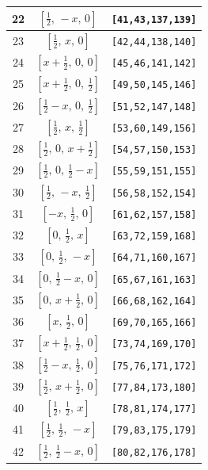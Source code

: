 \documentclass[fleqn,8pt]{jsarticle}
\begin{document}
\begin{longtable}{ccc}
22 & $\left[ \frac{1}{2},\, - x,\, 0 \right]$ & {\tt [41,43,137,139]} \\ \hline
23 & $\left[ \frac{1}{2},\, x,\, 0 \right]$ & {\tt [42,44,138,140]} \\ \hline
24 & $\left[ x + \frac{1}{2},\, 0,\, 0 \right]$ & {\tt [45,46,141,142]} \\ \hline
25 & $\left[ x + \frac{1}{2},\, 0,\, \frac{1}{2} \right]$ & {\tt [49,50,145,146]} \\ \hline
26 & $\left[ \frac{1}{2} - x,\, 0,\, \frac{1}{2} \right]$ & {\tt [51,52,147,148]} \\ \hline
27 & $\left[ \frac{1}{2},\, x,\, \frac{1}{2} \right]$ & {\tt [53,60,149,156]} \\ \hline
28 & $\left[ \frac{1}{2},\, 0,\, x + \frac{1}{2} \right]$ & {\tt [54,57,150,153]} \\ \hline
29 & $\left[ \frac{1}{2},\, 0,\, \frac{1}{2} - x \right]$ & {\tt [55,59,151,155]} \\ \hline
30 & $\left[ \frac{1}{2},\, - x,\, \frac{1}{2} \right]$ & {\tt [56,58,152,154]} \\ \hline
31 & $\left[ - x,\, \frac{1}{2},\, 0 \right]$ & {\tt [61,62,157,158]} \\ \hline
32 & $\left[ 0,\, \frac{1}{2},\, x \right]$ & {\tt [63,72,159,168]} \\ \hline
33 & $\left[ 0,\, \frac{1}{2},\, - x \right]$ & {\tt [64,71,160,167]} \\ \hline
34 & $\left[ 0,\, \frac{1}{2} - x,\, 0 \right]$ & {\tt [65,67,161,163]} \\ \hline
35 & $\left[ 0,\, x + \frac{1}{2},\, 0 \right]$ & {\tt [66,68,162,164]} \\ \hline
36 & $\left[ x,\, \frac{1}{2},\, 0 \right]$ & {\tt [69,70,165,166]} \\ \hline
37 & $\left[ x + \frac{1}{2},\, \frac{1}{2},\, 0 \right]$ & {\tt [73,74,169,170]} \\ \hline
38 & $\left[ \frac{1}{2} - x,\, \frac{1}{2},\, 0 \right]$ & {\tt [75,76,171,172]} \\ \hline
39 & $\left[ \frac{1}{2},\, x + \frac{1}{2},\, 0 \right]$ & {\tt [77,84,173,180]} \\ \hline
40 & $\left[ \frac{1}{2},\, \frac{1}{2},\, x \right]$ & {\tt [78,81,174,177]} \\ \hline
41 & $\left[ \frac{1}{2},\, \frac{1}{2},\, - x \right]$ & {\tt [79,83,175,179]} \\ \hline
42 & $\left[ \frac{1}{2},\, \frac{1}{2} - x,\, 0 \right]$ & {\tt [80,82,176,178]} \\ \hline

\end{longtable}
\end{document}
